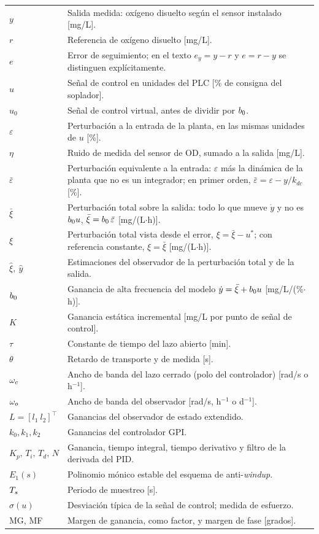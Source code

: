\begin{longtable}{p{2.6cm}p{12.5cm}}
$y$ & Salida medida: oxígeno disuelto según el sensor instalado [mg/L]. \\
$r$ & Referencia de oxígeno disuelto [mg/L]. \\
$e$ & Error de seguimiento; en el texto $e_y = y-r$ y $e = r-y$ se distinguen explícitamente. \\
$u$ & Señal de control en unidades del PLC [\% de consigna del soplador]. \\
$u_0$ & Señal de control virtual, antes de dividir por $b_{0}$. \\
$\varepsilon$ & Perturbación a la entrada de la planta, en las mismas unidades de $u$ [\%]. \\
$\eta$ & Ruido de medida del sensor de OD, sumado a la salida [mg/L]. \\
$\bar{\varepsilon}$ & Perturbación equivalente a la entrada: $\varepsilon$ más la dinámica de la planta que no es un integrador; en primer orden, $\bar{\varepsilon} = \varepsilon - y/k_{dc}$ [\%]. \\
$\bar{\xi}$ & Perturbación total sobre la salida: todo lo que mueve $\dot y$ y no es $b_{0} u$, $\bar{\xi} = b_{0}\,\bar{\varepsilon}$ [mg/(L$\cdot$h)]. \\
$\xi$ & Perturbación total vista desde el error, $\xi = \bar{\xi} - u^*$; con referencia constante, $\xi = \bar{\xi}$ [mg/(L$\cdot$h)]. \\
$\hat{\xi},\ \hat{y}$ & Estimaciones del observador de la perturbación total y de la salida. \\
$b_{0}$ & Ganancia de alta frecuencia del modelo $\dot y=\bar{\xi}+b_{0} u$ [mg/L/(\%$\cdot$h)]. \\
$K$ & Ganancia estática incremental [mg/L por punto de señal de control]. \\
$\tau$ & Constante de tiempo del lazo abierto [min]. \\
$\theta$ & Retardo de transporte y de medida [s]. \\
$\omega_{c}$ & Ancho de banda del lazo cerrado (polo del controlador) [rad/s o h$^{-1}$]. \\
$\omega_{o}$ & Ancho de banda del observador [rad/s, h$^{-1}$ o d$^{-1}$]. \\
$L=[l_1\ l_2]^{\!\top}$ & Ganancias del observador de estado extendido. \\
$k_0,k_1,k_2$ & Ganancias del controlador GPI. \\
$K_p,\,T_i,\,T_d,\,N$ & Ganancia, tiempo integral, tiempo derivativo y filtro de la derivada del PID. \\
$E_1(s)$ & Polinomio mónico estable del esquema de anti-\emph{windup}. \\
$T_{s}$ & Periodo de muestreo [s]. \\
$\sigma(u)$ & Desviación típica de la señal de control; medida de esfuerzo. \\
MG, MF & Margen de ganancia, como factor, y margen de fase [grados]. \\
\end{longtable}

